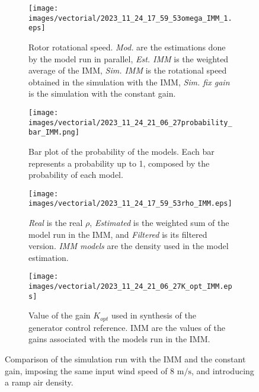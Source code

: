 \documentclass[11pt, a4paper]{article}
\begin{document}
\begin{figure}[htb]
  \begin{subfigure}{0.49\columnwidth}
    \centering
    \texttt{[image: images/vectorial/2023\_11\_24\_17\_59\_53omega\_IMM\_1.eps]}
    \caption{Rotor rotational speed. \textit{Mod.} are the estimations done by the model run in parallel, \textit{Est. IMM} is the weighted average of the IMM, \textit{Sim. IMM} is the rotational speed obtained in the simulation with the IMM, \textit{Sim. fix gain} is the simulation with the constant gain.}
    \label{fig:fig_omega_IMM_1}
  \end{subfigure}
  \begin{subfigure}{0.49\columnwidth}
    \centering
    \texttt{[image: images/vectorial/2023\_11\_24\_21\_06\_27probability\_bar\_IMM.png]}
    \caption{Bar plot of the probability of the models. Each bar represents a probability up to 1, composed by the probability of each model.}
    \label{fig:fig_probability_IMM}
  \end{subfigure}
  \begin{subfigure}{0.49\columnwidth}
    \centering
    \texttt{[image: images/vectorial/2023\_11\_24\_17\_59\_53rho\_IMM.eps]}
    \caption{\textit{Real} is the real $\rho$, \textit{Estimated} is the weighted sum of the model run in the IMM, and \textit{Filtered} is its filtered version. \textit{IMM models} are the density used in the model estimation.}
    \label{fig:fig_rho_IMM}
  \end{subfigure}
  \begin{subfigure}{0.49\columnwidth}
    \centering
    \texttt{[image: images/vectorial/2023\_11\_24\_21\_06\_27K\_opt\_IMM.eps]}
    \caption{Value of the gain $K_{opt}$ used in synthesis of the generator control reference. IMM are the values of the gains associated with the models run in the IMM.}
    \label{fig:fig_K_IMM}
  \end{subfigure}
  \caption{Comparison of the simulation run with the IMM and the constant gain, imposing the same input wind speed of 8 $\si{\meter\per\second}$, and introducing a ramp air density.}
  \label{fig:fig_IMM_sim_const_WS}
\end{figure}
\end{document}
